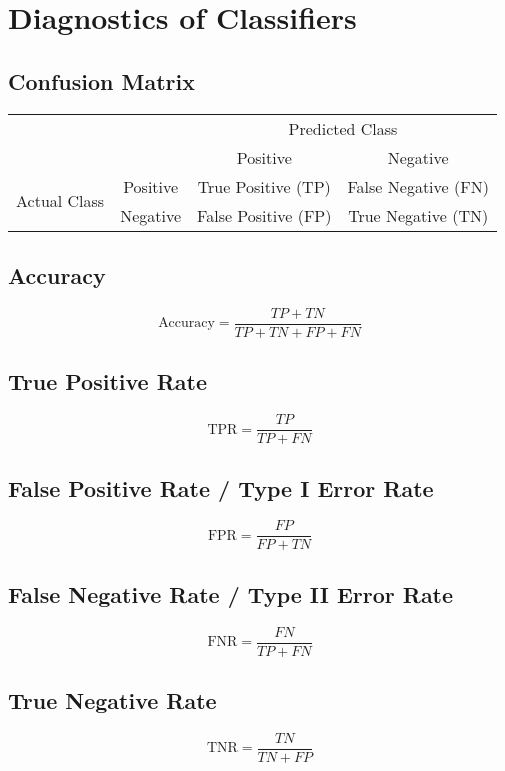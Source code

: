 \documentclass[../../dsa1101_notes.Rtex]{subfiles}\usepackage[]{graphicx}\usepackage[]{color}
\begin{document}
\section{Diagnostics of Classifiers}
\subsection{Confusion Matrix}
\begin{center}
\begin{tabular}{|c|c|c|c|}
\cline{3-4}
\multicolumn{2}{c}{} & \multicolumn{2}{|c|}{Predicted Class}\\
\cline{3-4}
\multicolumn{2}{c}{} & \multicolumn{1}{|c|}{Positive} & Negative\\
\hline
\multirow{2}{3em}{Actual Class} & \multicolumn{1}{c}{Positive} & \multicolumn{1}{|c|}{True Positive (TP)} & False Negative (FN)\\
\cline{2-4}
& \multicolumn{1}{c}{Negative} & \multicolumn{1}{|c|}{False Positive (FP)} & True Negative (TN)\\
\hline
\end{tabular}
\end{center}

\subsection{Accuracy}
\[\text{Accuracy} = \frac{TP + TN}{TP + TN + FP + FN}\]

\subsection{True Positive Rate}
\[\text{TPR} = \frac{TP}{TP + FN}\]

\subsection{False Positive Rate / Type I Error Rate}
\[\text{FPR} = \frac{FP}{FP + TN}\]

\subsection{False Negative Rate / Type II Error Rate}
\[\text{FNR} = \frac{FN}{TP + FN}\]

\subsection{True Negative Rate}
\[\text{TNR} = \frac{TN}{TN+FP}\]
\end{document}
